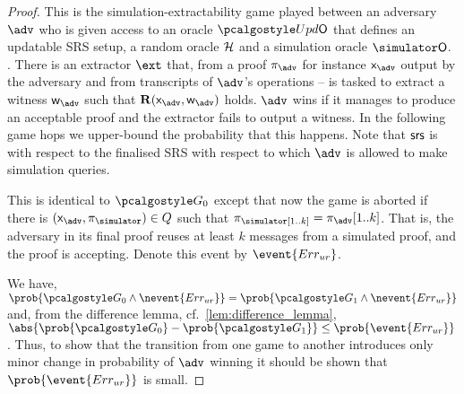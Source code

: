 \begin{proof}		

   This is the simulation-extractability game played between an adversary
  $\advse$ who is given access to an oracle $\initU$ that defines an updatable SRS
  setup, a random oracle $\mathcal{H}$ and a simulation oracle $\simO$. . There is an
  extractor $\ext$ that, from a proof $\zkproof_{\advse}$ for instance
  $\inp_{\advse}$ output by the adversary and from transcripts of $\advse$'s
  operations   
     -- is
  tasked to extract a witness $\wit_{\advse}$ such that
  $\REL(\inp_{\advse}, \wit_{\advse})$ holds. $\advse$ wins if it manages to produce
  an acceptable proof and the extractor fails to output a witness. In the following
  game hops we upper-bound the probability that this happens. Note that $\mathsf{srs}$ is
  with respect to the finalised SRS with respect to which $\adv$ is allowed to make
  simulation queries.

   This is identical to $\game{0}$ except that now the game is aborted
  if there is $(\inp_\advse, \zkproof_{\simulator}) \in Q$ such that $\zkproof_\simulator[1..k] = \zkproof_{\advse}[1..k]$. That is, the adversary in its final proof
  reuses at least $k$ messages from a simulated proof, and the proof is accepting.
  Denote this event by $\event{\errur}$.

     We have,
  \( \prob{\game{0} \land \nevent{\errur}} = \prob{\game{1} \land \nevent{\errur}} \)
  and, from the difference lemma, cf.~\cref{lem:difference_lemma},
  $ \abs{\prob{\game{0}} - \prob{\game{1}}} \leq \prob{\event{\errur}}\,$.  Thus, to
  show that the transition from one game to another introduces only minor change in
  probability of $\adv$ winning it should be shown that $\prob{\event{\errur}}$ is
  small.
  

\end{proof}
